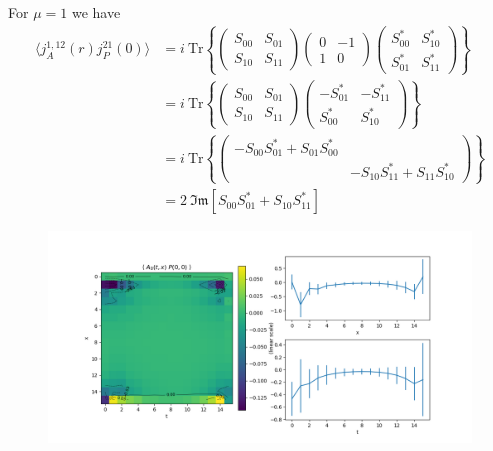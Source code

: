\documentclass{article}
\newcommand{\Tr}[1]{\text{Tr}\left\{ #1 \right\}}
\renewcommand{\Im}[1]{\mathfrak{Im}\left[ #1 \right]}
\begin{document}
For $\mu = 1$ we have
\begin{align*}
    \langle j_A^{1, 12} (r) j_P^{21}(0) \rangle 
    &= i \ \Tr{ \begin{pmatrix} S_{00} & S_{01} \\ S_{10} & S_{11} \end{pmatrix} \begin{pmatrix} 0 & -1 \\ 1 & 0 \end{pmatrix} \begin{pmatrix} S_{00}^* & S_{10}^* \\ S_{01}^* & S_{11}^* \end{pmatrix} } \\
    &= i \ \Tr{ \begin{pmatrix} S_{00} & S_{01} \\ S_{10} & S_{11} \end{pmatrix} \begin{pmatrix} -S_{01}^* & -S_{11}^* \\ S_{00}^* & S_{10}^* \end{pmatrix}} \\
    &= i \ \Tr{\begin{pmatrix} -S_{00} S_{01}^* + S_{01} S_{00}^* &  \\ & -S_{10} S_{11}^* + S_{11} S_{10}^* \end{pmatrix}} \\
    &= 2 \ \Im{S_{00} S_{01}^* + S_{10} S_{11}^*}
\end{align*}

\begin{figure}[H]
    \centering
    \includegraphics[width=\textwidth]{../plots/A0P.png}
    \caption{}
    \label{}
\end{figure}
\end{document}
